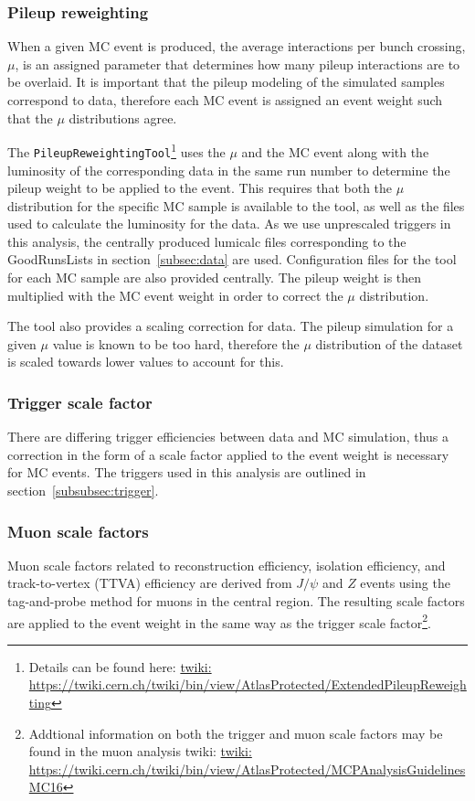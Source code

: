 \subsubsection{Pileup reweighting}
\label{subsec:PRW}
When a given MC event is produced, the average interactions per bunch crossing, $\mu$, is an assigned parameter that determines how many pileup interactions are to be overlaid.
It is important that the pileup modeling of the simulated samples correspond to data, therefore each MC event is assigned an event weight such that the $\mu$ distributions agree.

The \texttt{PileupReweightingTool}\footnote{Details can be found here: \url{twiki: https://twiki.cern.ch/twiki/bin/view/AtlasProtected/ExtendedPileupReweighting}} uses the $\mu$ and the MC event along with the luminosity of the corresponding data in the same run number to determine the pileup weight to be applied to the event.
This requires that both the $\mu$ distribution for the specific MC sample is available to the tool, as well as the files used to calculate the luminosity for the data. As we use unprescaled triggers in this analysis, the centrally produced lumicalc files corresponding to the GoodRunsLists in section~\ref{subsec:data} are used.
Configuration files for the tool for each MC sample are also provided centrally.
The pileup weight is then multiplied with the MC event weight in order to correct the $\mu$ distribution.

The tool also provides a scaling correction for data. The pileup simulation for a given $\mu$ value is known to be too hard, therefore the $\mu$ distribution of the dataset is scaled towards lower values to account for this.

\subsubsection{Trigger scale factor}
There are differing trigger efficiencies between data and MC simulation, thus a correction in the form of a scale factor applied to the event weight is necessary for MC events. The triggers used in this analysis are outlined in section~\ref{subsubsec:trigger}.

\subsubsection{Muon scale factors}
Muon scale factors related to reconstruction efficiency, isolation efficiency, and track-to-vertex (TTVA) efficiency are derived from $J/\psi$ and $Z$ events using the tag-and-probe method for muons in the central region. The resulting scale factors are applied to the event weight in the same way as the trigger scale
factor\footnote{Addtional information on both the trigger and muon scale factors may be found in the muon analysis twiki: \url{twiki: https://twiki.cern.ch/twiki/bin/view/AtlasProtected/MCPAnalysisGuidelinesMC16}}.
